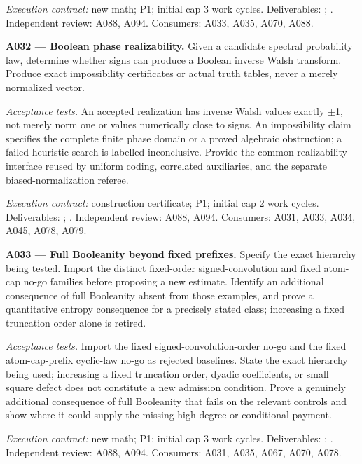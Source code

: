 \documentclass[11pt]{article}
\begin{document}
{\small\emph{Execution contract:} new math; P1; initial cap 3 work cycles. Deliverables: ; . Independent review: A088, A094. Consumers: A033, A035, A070, A088.}

\textbf{A032 --- Boolean phase realizability.} Given a candidate spectral probability law, determine whether signs can produce a Boolean inverse Walsh transform. Produce exact impossibility certificates or actual truth tables, never a merely normalized vector.

\emph{Acceptance tests.} An accepted realization has inverse Walsh values exactly $\pm$1, not merely norm one or values numerically close to signs. An impossibility claim specifies the complete finite phase domain or a proved algebraic obstruction; a failed heuristic search is labelled inconclusive. Provide the common realizability interface reused by uniform coding, correlated auxiliaries, and the separate biased-normalization referee.

{\small\emph{Execution contract:} construction certificate; P1; initial cap 2 work cycles. Deliverables: ; . Independent review: A088, A094. Consumers: A031, A033, A034, A045, A078, A079.}

\textbf{A033 --- Full Booleanity beyond fixed prefixes.} Specify the exact hierarchy being tested. Import the distinct fixed-order signed-convolution and fixed atom-cap no-go families before proposing a new estimate. Identify an additional consequence of full Booleanity absent from those examples, and prove a quantitative entropy consequence for a precisely stated class; increasing a fixed truncation order alone is retired.

\emph{Acceptance tests.} Import the fixed signed-convolution-order no-go and the fixed atom-cap-prefix cyclic-law no-go as rejected baselines. State the exact hierarchy being used; increasing a fixed truncation order, dyadic coefficients, or small square defect does not constitute a new admission condition. Prove a genuinely additional consequence of full Booleanity that fails on the relevant controls and show where it could supply the missing high-degree or conditional payment.

{\small\emph{Execution contract:} new math; P1; initial cap 3 work cycles. Deliverables: ; . Independent review: A088, A094. Consumers: A031, A035, A067, A070, A078.}
\end{document}
